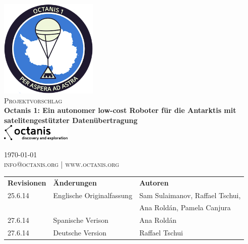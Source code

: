 \documentclass[a4paper,12pt]{article}
\begin{document}
\begin{titlepage}
\begin{center}

\includegraphics[width=0.35\textwidth]{patch}~\\[2cm]

\textsc{\Large Projektvorschlag}\\[0.5cm]

\huge \bfseries Octanis 1: Ein autonomer low-cost Roboter für die Antarktis mit satelitengestützter Datenübertragung \\[0.4cm] 

\vspace{23pt}
\includegraphics[width=0.25\textwidth]{black_logo} \\
\vfill

{\large \today} \\
\textsc{\small info@octanis.org | www.octanis.org}
\vspace{50pt}


\begin{table}[h!]
\centering
\vspace{1pt}
\begin{tabular}{ l  l  l }
	\textbf{Revisionen} & \textbf{Änderungen} & \textbf{Autoren} \\
	25.6.14 & Englische Originalfassung & Sam Sulaimanov, Raffael Tschui, \\ & & Ana Roldán, Pamela Canjura \\
	27.6.14 & Spanische Verison & Ana Roldán \\
	27.6.14 & Deutsche Version & Raffael Tschui \\
\end{tabular}
\end{table}

\end{center}
\end{titlepage}
\end{document}
